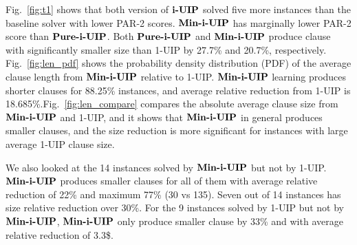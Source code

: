 Fig.~\ref{fig:t1} shows that both version of $\textbf{i-UIP}$ solved five more instances than the baseline solver with lower PAR-2 scores. $\textbf{Min-i-UIP}$ has marginally lower PAR-2 score than $\textbf{Pure-i-UIP}$. Both $\textbf{Pure-i-UIP}$ and $\textbf{Min-i-UIP}$ produce clause with significantly smaller size than 1-UIP by 27.7\% and 20.7\%, respectively. Fig.~\ref{fig:len_pdf} shows the probability density distribution (PDF) of the average clause length from $\textbf{Min-i-UIP}$ relative to 1-UIP. $\textbf{Min-i-UIP}$ learning produces shorter clauses for 88.25\% instances, and average relative reduction from 1-UIP is 18.685\%.Fig.~\ref{fig:len_compare} compares the absolute average clause size from $\textbf{Min-i-UIP}$ and 1-UIP, and it shows that $\textbf{Min-i-UIP}$ in general produces smaller clauses, and the size reduction is more significant for instances with large average 1-UIP clause size. 

We also looked at the 14 instances solved by $\textbf{Min-i-UIP}$ but not by 1-UIP. $\textbf{Min-i-UIP}$ produces smaller clauses for all of them with average relative reduction of 22\% and maximum 77\% (30 vs 135). Seven out of 14 instances has size relative reduction over 30\%. For the 9 instances solved by 1-UIP but not by $\textbf{Min-i-UIP}$, $\textbf{Min-i-UIP}$ only produce smaller clause by 33\% and with average relative reduction of 3.3\$.



